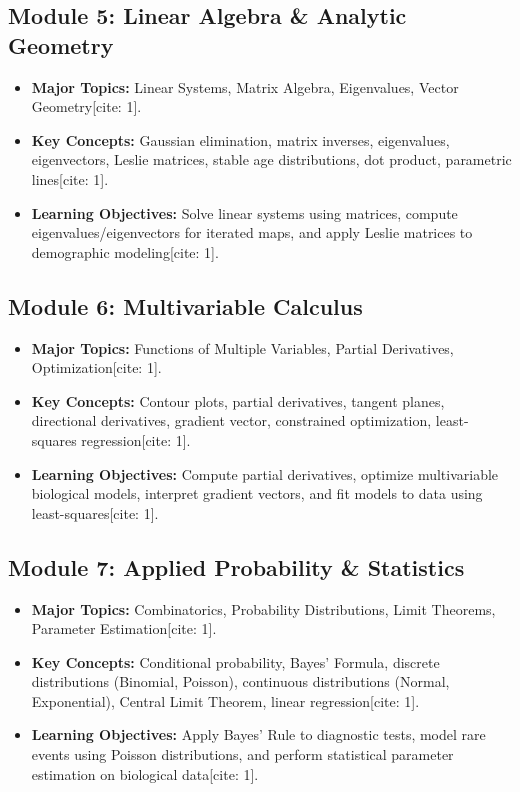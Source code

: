 \documentclass[10pt, letterpaper]{article}
\begin{document}
\subsection{Module 5: Linear Algebra \& Analytic Geometry}
\begin{itemize}[leftmargin=*]
    \item \textbf{Major Topics:} Linear Systems, Matrix Algebra, Eigenvalues, Vector Geometry[cite: 1].
    \item \textbf{Key Concepts:} Gaussian elimination, matrix inverses, eigenvalues, eigenvectors, Leslie matrices, stable age distributions, dot product, parametric lines[cite: 1].
    \item \textbf{Learning Objectives:} Solve linear systems using matrices, compute eigenvalues/eigenvectors for iterated maps, and apply Leslie matrices to demographic modeling[cite: 1].
\end{itemize}

\subsection{Module 6: Multivariable Calculus}
\begin{itemize}[leftmargin=*]
    \item \textbf{Major Topics:} Functions of Multiple Variables, Partial Derivatives, Optimization[cite: 1].
    \item \textbf{Key Concepts:} Contour plots, partial derivatives, tangent planes, directional derivatives, gradient vector, constrained optimization, least-squares regression[cite: 1].
    \item \textbf{Learning Objectives:} Compute partial derivatives, optimize multivariable biological models, interpret gradient vectors, and fit models to data using least-squares[cite: 1].
\end{itemize}

\subsection{Module 7: Applied Probability \& Statistics}
\begin{itemize}[leftmargin=*]
    \item \textbf{Major Topics:} Combinatorics, Probability Distributions, Limit Theorems, Parameter Estimation[cite: 1].
    \item \textbf{Key Concepts:} Conditional probability, Bayes' Formula, discrete distributions (Binomial, Poisson), continuous distributions (Normal, Exponential), Central Limit Theorem, linear regression[cite: 1].
    \item \textbf{Learning Objectives:} Apply Bayes' Rule to diagnostic tests, model rare events using Poisson distributions, and perform statistical parameter estimation on biological data[cite: 1].
\end{itemize}
\end{document}
